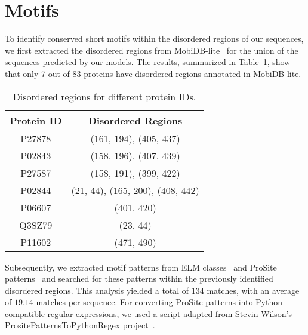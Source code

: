 \section{Motifs}

To identify conserved short motifs within the disordered regions of our sequences, we first extracted the disordered regions from MobiDB-lite~\cite{mobidb} for the union of the sequences predicted by our models. The results, summarized in Table~\ref{tab:disordered_regions}, show that only 7 out of $83$ proteins have disordered regions annotated in MobiDB-lite.

\begin{table}[H]
\centering
\begin{tabular}{|c|c|}
\hline
\textbf{Protein ID} & \textbf{Disordered Regions} \\ \hline
P27878 & (161, 194), (405, 437) \\ \hline
P02843 & (158, 196), (407, 439) \\ \hline
P27587 & (158, 191), (399, 422) \\ \hline
P02844 & (21, 44), (165, 200), (408, 442) \\ \hline
P06607 & (401, 420) \\ \hline
Q3SZ79 & (23, 44) \\ \hline
P11602 & (471, 490) \\ \hline
\end{tabular}
\caption{Disordered regions for different protein IDs.}
\label{tab:disordered_regions}
\end{table}

Subsequently, we extracted motif patterns from ELM classes~\cite{elm} and ProSite patterns~\cite{prosite} and searched for these patterns within the previously identified disordered regions. This analysis yielded a total of $134$ matches, with an average of $19.14$ matches per sequence. For converting ProSite patterns into Python-compatible regular expressions, we used a script adapted from Stevin Wilson's PrositePatternsToPythonRegex project~\cite{stevin_wilson}.
